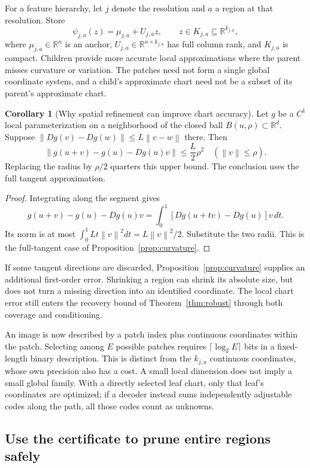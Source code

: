 \documentclass[11pt,a4paper]{article}
\theoremstyle{definition}
\newtheorem{corollary}[theorem]{Corollary}
\theoremstyle{definition}
\theoremstyle{remark}\newtheorem{remark}[theorem]{Remark}
\newcommand{\R}{\mathbb R}\newcommand{\Prob}{\mathbb P}\newcommand{\E}{\mathbb E}
\newcommand{\norm}[1]{\left\lVert #1\right\rVert}
\begin{document}
For a feature hierarchy, let $j$ denote the resolution and $a$ a region at that resolution. Store
\[
\psi_{j,a}(z)=\mu_{j,a}+U_{j,a}z,
\qquad z\in K_{j,a}\subseteq\R^{k_{j,a}},
\]
where $\mu_{j,a}\in\R^n$ is an anchor, $U_{j,a}\in\R^{n\times k_{j,a}}$ has full column rank, and $K_{j,a}$ is compact. Children provide more accurate local approximations where the parent misses curvature or variation. The patches need not form a single global coordinate system, and a child's approximate chart need not be a subset of its parent's approximate chart.

\begin{corollary}[Why spatial refinement can improve chart accuracy]\label{cor:treerefinement}
Let $g$ be a $C^1$ local parameterization on a neighborhood of the closed ball $\overline B(u,\rho)\subset\R^d$. Suppose $\norm{Dg(v)-Dg(w)}\le L\norm{v-w}$ there. Then
\[
\norm{g(u+v)-g(u)-Dg(u)v}\le\frac L2\rho^2
\quad(\norm v\le\rho).
\]
Replacing the radius by $\rho/2$ quarters this upper bound. The conclusion uses the full tangent approximation.
\end{corollary}
\begin{proof}
Integrating along the segment gives
\[
g(u+v)-g(u)-Dg(u)v
=\int_0^1[Dg(u+tv)-Dg(u)]v\,dt.
\]
Its norm is at most $\int_0^1 Lt\norm v^2dt=L\norm v^2/2$. Substitute the two radii. This is the full-tangent case of Proposition~\ref{prop:curvature}.
\end{proof}

If some tangent directions are discarded, Proposition~\ref{prop:curvature} supplies an additional first-order error. Shrinking a region can shrink its absolute size, but does not turn a missing direction into an identified coordinate. The local chart error still enters the recovery bound of Theorem~\ref{thm:robust} through both coverage and conditioning.

An image is now described by a patch index plus continuous coordinates within the patch. Selecting among $E$ possible patches requires $\lceil\log_2 E\rceil$ bits in a fixed-length binary description. This is distinct from the $k_{j,a}$ continuous coordinates, whose own precision also has a cost. A small local dimension does not imply a small global family. With a directly selected leaf chart, only that leaf's coordinates are optimized; if a decoder instead sums independently adjustable codes along the path, all those codes count as unknowns.

\subsection{Use the certificate to prune entire regions safely}
\end{document}
